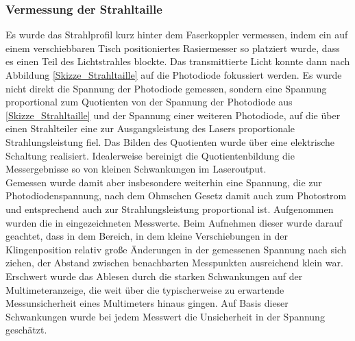 \documentclass[11pt,a4paper,oneside]{scrartcl}
\begin{document}
\subsubsection{Vermessung der Strahltaille}\label{Durchführung Vermessung der Strahltaille}
Es wurde das Strahlprofil kurz hinter dem Faserkoppler vermessen, indem ein auf einem verschiebbaren Tisch positioniertes Rasiermesser so platziert wurde, dass es einen Teil des Lichtstrahles blockte. Das transmittierte Licht konnte dann nach Abbildung \ref{Skizze_Strahltaille} auf die Photodiode fokussiert werden. Es wurde nicht direkt die Spannung der Photodiode gemessen, sondern eine Spannung proportional zum Quotienten von der Spannung der Photodiode aus \ref{Skizze_Strahltaille} und der Spannung einer weiteren Photodiode, auf die über einen Strahlteiler eine zur Ausgangsleistung des Lasers proportionale Strahlungsleistung fiel. Das Bilden des Quotienten wurde über eine elektrische Schaltung realisiert. Idealerweise bereinigt die Quotientenbildung die Messergebnisse so von kleinen Schwankungen im Laseroutput.\\
Gemessen wurde damit aber insbesondere weiterhin eine Spannung, die zur Photodiodenspannung, nach dem Ohmschen Gesetz damit auch zum Photostrom und entsprechend auch zur Strahlungsleistung proportional ist. Aufgenommen wurden die in  eingezeichneten Messwerte. Beim Aufnehmen dieser wurde darauf geachtet, dass in dem Bereich, in dem kleine Verschiebungen in der Klingenposition relativ große Änderungen in der gemessenen Spannung nach sich ziehen, der Abstand zwischen benachbarten Messpunkten ausreichend klein war. Erschwert wurde das Ablesen durch die starken Schwankungen auf der Multimeteranzeige, die weit über die typischerweise zu erwartende Messunsicherheit eines Multimeters hinaus gingen. Auf Basis dieser Schwankungen wurde bei jedem Messwert die Unsicherheit in der Spannung geschätzt.
\end{document}
